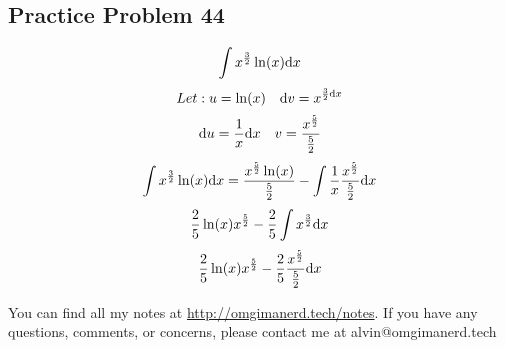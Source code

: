 \documentclass[letterpaper, 12pt]{math}
\begin{document}
\subsection*{Practice Problem 44}
\[ \int{x^{\frac{3}{2}}\ln(x)\mathrm{d}{x}} \]
\[ Let: u = \ln(x) \quad \mathrm{d}{v} = x^{\frac{3}{2}\mathrm{d}{x}} \]
\[ \mathrm{d}{u} = \frac{1}{x}\mathrm{d}{x} \quad v =
   \frac{x^{\frac{5}{2}}}{\frac{5}{2}} \]
\[ \int{x^{\frac{3}{2}}\ln(x)\mathrm{d}{x}}=
   \frac{x^{\frac{5}{2}}\ln(x)}{\frac{5}{2}}-
   \int{\frac{1}{x}\frac{x^{\frac{5}{2}}}{\frac{5}{2}}\mathrm{d}{x}} \]
\[ \frac{2}{5}\ln(x)x^{\frac{5}{2}}-\frac{2}{5}\int{x^{\frac{3}{2}}\mathrm{d}{x}} \]
\[ \frac{2}{5}\ln(x)x^{\frac{5}{2}}-
   \frac{2}{5}\frac{x^{\frac{5}{2}}}{\frac{5}{2}}\mathrm{d}{x} \]

\begin{center}
  You can find all my notes at \url{http://omgimanerd.tech/notes}. If you have
  any questions, comments, or concerns, please contact me at
  alvin@omgimanerd.tech
\end{center}
\end{document}
